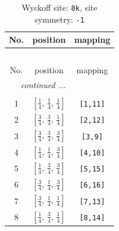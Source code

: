 \documentclass[fleqn,8pt]{jsarticle}
\begin{document}
\renewcommand{\arraystretch}{1.2}
\begin{longtable}{ccc}
\caption{Wyckoff site: {\tt 8k}, site symmetry: {\tt -1}}
 \\
 \hline \hline
No. & position & mapping \\ \hline \endfirsthead

\multicolumn{2}{l}{\tablename\ \thetable{}} \\
 \hline \hline
No. & position & mapping \\ \hline \endhead

 \hline \hline
\multicolumn{2}{r}{\footnotesize\it continued ...} \\ \endfoot

 \hline \hline
\multicolumn{2}{r}{} \\ \endlastfoot

1 & $\left[ \frac{1}{4},\, \frac{1}{4},\, \frac{1}{4} \right]$ & {\tt [1,11]} \\ \hline
2 & $\left[ \frac{3}{4},\, \frac{3}{4},\, \frac{1}{4} \right]$ & {\tt [2,12]} \\ \hline
3 & $\left[ \frac{3}{4},\, \frac{3}{4},\, \frac{3}{4} \right]$ & {\tt [3,9]} \\ \hline
4 & $\left[ \frac{1}{4},\, \frac{1}{4},\, \frac{3}{4} \right]$ & {\tt [4,10]} \\ \hline
5 & $\left[ \frac{1}{4},\, \frac{3}{4},\, \frac{3}{4} \right]$ & {\tt [5,15]} \\ \hline
6 & $\left[ \frac{3}{4},\, \frac{1}{4},\, \frac{3}{4} \right]$ & {\tt [6,16]} \\ \hline
7 & $\left[ \frac{3}{4},\, \frac{1}{4},\, \frac{1}{4} \right]$ & {\tt [7,13]} \\ \hline
8 & $\left[ \frac{1}{4},\, \frac{3}{4},\, \frac{1}{4} \right]$ & {\tt [8,14]} \\
\end{longtable}
\renewcommand{\arraystretch}{1.2}
\end{document}
